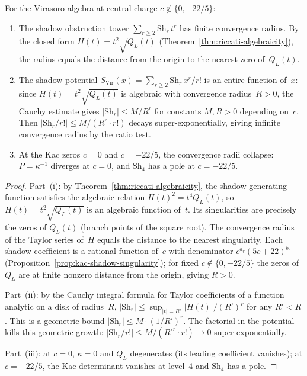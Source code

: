 \begin{proposition}
\label{prop:nms-shadow-convergence}%
%
For the Virasoro algebra at central charge $c \notin \{0, -22/5\}$:
\begin{enumerate}[label=\textup{(\roman*)}]
\item The shadow obstruction tower $\sum_{r \geq 2} \mathrm{Sh}_r\,t^r$ has
 finite convergence radius. By the closed form
 $H(t) = t^2\sqrt{Q_L(t)}$
 \textup{(}Theorem~\textup{\ref{thm:riccati-algebraicity})},
 the radius equals the distance from the origin to the nearest
 zero of~$Q_L(t)$.
\item The shadow potential $S_{\mathrm{Vir}}(x) = \sum_{r \geq 2}
 \mathrm{Sh}_r\,x^r/r!$ is an entire function of~$x$:
 since $H(t) = t^2\sqrt{Q_L(t)}$ is algebraic with convergence
 radius~$R > 0$, the Cauchy estimate gives
 $|\mathrm{Sh}_r| \leq M / R^r$ for constants $M, R > 0$
 depending on~$c$. Then
 $|\mathrm{Sh}_r/r!| \leq M/(R^r \cdot r!)$
 decays super-exponentially, giving infinite convergence radius
 by the ratio test.
\item At the Kac zeros $c = 0$ and $c = -22/5$, the convergence
 radii collapse: $P = \kappa^{-1}$ diverges at $c = 0$, and
 $\mathrm{Sh}_4$ has a pole at $c = -22/5$.
\end{enumerate}
\end{proposition}

\begin{proof}
Part~(i): by Theorem~\ref{thm:riccati-algebraicity}, the shadow
generating function satisfies the algebraic relation
$H(t)^2 = t^4 Q_L(t)$, so $H(t) = t^2\sqrt{Q_L(t)}$ is an
algebraic function of~$t$. Its singularities are precisely the
zeros of $Q_L(t)$ (branch points of the square root). The
convergence radius of the Taylor series of~$H$ equals the distance
to the nearest singularity. Each shadow coefficient is a rational
function of~$c$ with denominator $c^{a_r}(5c+22)^{b_r}$
(Proposition~\ref{prop:kac-shadow-singularity}); for fixed
$c \notin \{0, -22/5\}$ the zeros of~$Q_L$ are at finite
nonzero distance from the origin, giving $R > 0$.

Part~(ii): by the Cauchy integral formula for Taylor coefficients
of a function analytic on a disk of radius~$R$,
$|\mathrm{Sh}_r| \leq \sup_{|t|=R'} |H(t)| / (R')^r$
for any $R' < R$. This is a geometric bound $|\mathrm{Sh}_r|
\leq M \cdot (1/R')^r$. The factorial in the potential kills this
geometric growth: $|\mathrm{Sh}_r / r!| \leq M / (R'^r \cdot r!)
\to 0$ super-exponentially.

Part~(iii): at $c = 0$, $\kappa = 0$ and $Q_L$ degenerates
(its leading coefficient vanishes); at $c = -22/5$, the Kac
determinant vanishes at level~$4$ and $\mathrm{Sh}_4$ has a pole.
\end{proof}


